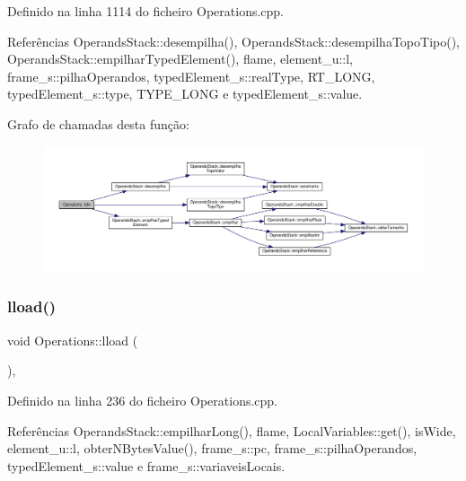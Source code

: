 Definido na linha 1114 do ficheiro Operations.\+cpp.



Referências Operands\+Stack\+::desempilha(), Operands\+Stack\+::desempilha\+Topo\+Tipo(), Operands\+Stack\+::empilhar\+Typed\+Element(), flame, element\+\_\+u\+::l, frame\+\_\+s\+::pilha\+Operandos, typed\+Element\+\_\+s\+::real\+Type, R\+T\+\_\+\+L\+O\+NG, typed\+Element\+\_\+s\+::type, T\+Y\+P\+E\+\_\+\+L\+O\+NG e typed\+Element\+\_\+s\+::value.

Grafo de chamadas desta função\+:
\nopagebreak
\begin{figure}[H]
\begin{center}
\leavevmode
\includegraphics[width=350pt]{classOperations_ab9bb90a9db0433e1d04b0eb9bceea9f4_cgraph}
\end{center}
\end{figure}
\mbox{\label{classOperations_abd9d44b782cc5ae7d7985a424a0985c6}} 
\subsubsection{\texorpdfstring{lload()}{lload()}}
{\footnotesize\ttfamily void Operations\+::lload (\begin{DoxyParamCaption}{ }\end{DoxyParamCaption})\hspace{0.3cm}{\ttfamily [static]}, {\ttfamily [private]}}



Definido na linha 236 do ficheiro Operations.\+cpp.



Referências Operands\+Stack\+::empilhar\+Long(), flame, Local\+Variables\+::get(), is\+Wide, element\+\_\+u\+::l, obter\+N\+Bytes\+Value(), frame\+\_\+s\+::pc, frame\+\_\+s\+::pilha\+Operandos, typed\+Element\+\_\+s\+::value e frame\+\_\+s\+::variaveis\+Locais.

